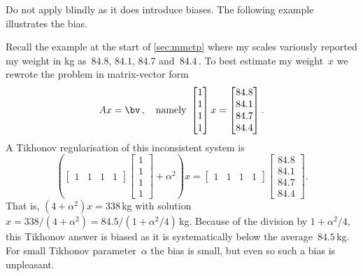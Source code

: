 \begin{activity}
\end{activity}



Do not apply  blindly as it does introduce biases. 
The following example illustrates the bias.

\begin{example} \label{eg:}
Recall the example at the start of \autoref{sec:mmctp} where my scales variously reported my weight in kg as~\(84.8\), \(84.1\), \(84.7\) and~\(84.4\)\,.  
To best estimate my weight~\(x\) we rewrote the problem in matrix-vector form
\begin{equation*}
Ax=\bv\,,\quad\text{namely }
\begin{bmatrix} 1\\1\\1\\1 \end{bmatrix}x
=\begin{bmatrix} 84.8\\84.1\\84.7\\84.4 \end{bmatrix}.
\end{equation*}
A Tikhonov regularisation of this inconsistent system is
\begin{equation*}
\left(\begin{bmatrix} 1&1&1&1 \end{bmatrix}\begin{bmatrix} 1\\1\\1\\1 \end{bmatrix}+\alpha^2\right)x
=\begin{bmatrix} 1&1&1&1 \end{bmatrix}\begin{bmatrix} 84.8\\84.1\\84.7\\84.4 \end{bmatrix}.
\end{equation*}
That is, \((4+\alpha^2)x=338\)\,kg with solution \(x=338/(4+\alpha^2)=84.5/(1+\alpha^2/4)\)\,kg.
Because of the division by \(1+\alpha^2/4\), this Tikhonov answer is biased as it is systematically below the average~\(84.5\)\,kg.
For small Tikhonov parameter~\(\alpha\) the bias is small, but even so such a bias is unpleasant.
\end{example}



